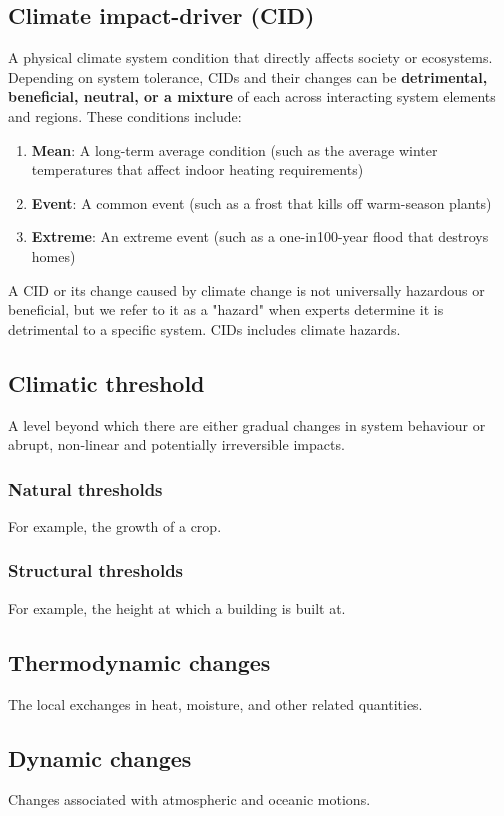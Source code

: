 \documentclass[11pt]{article}
\begin{document}
\subsection{Climate impact-driver (CID)}
\label{sec:org7db114d}
A physical climate system condition that directly affects society or ecosystems. Depending on system tolerance, CIDs and their changes can be \textbf{detrimental, beneficial, neutral, or a mixture} of each across interacting system elements and regions. These conditions include:
\begin{enumerate}
\item \textbf{Mean}: A long-term average condition (such as the average winter temperatures that affect indoor heating requirements)
\item \textbf{Event}: A common event (such as a frost that kills off warm-season plants)
\item \textbf{Extreme}: An extreme event (such as a one-in100-year flood that destroys homes)
\end{enumerate}

A CID or its change caused by climate change is not universally hazardous or beneficial, but we refer to it as a "hazard" when experts determine it is detrimental to a specific system. CIDs includes climate hazards.
\subsection{Climatic threshold}
\label{sec:org7483c23}
A level beyond which there are either gradual changes in system behaviour or abrupt, non-linear and potentially irreversible impacts.
\subsubsection{Natural thresholds}
\label{sec:org8559db9}
For example, the growth of a crop.
\subsubsection{Structural thresholds}
\label{sec:orgc794c3b}
For example, the height at which a building is built at.
\subsection{Thermodynamic changes}
\label{sec:orga3ddf85}
The local exchanges in heat, moisture, and other related quantities.
\subsection{Dynamic changes}
\label{sec:orgbfb275e}
Changes associated with atmospheric and oceanic motions.
\end{document}
